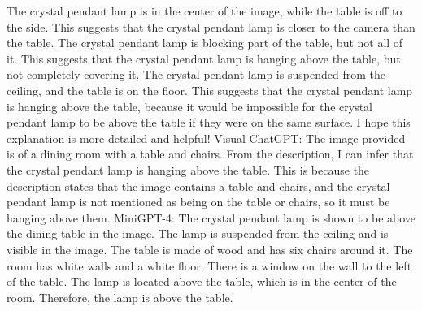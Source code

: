 \begin{enumerate}
    The crystal pendant lamp is in the center of the image, while the table is off to the side. This suggests that the crystal pendant lamp is closer to the camera than the table.
    The crystal pendant lamp is blocking part of the table, but not all of it. This suggests that the crystal pendant lamp is hanging above the table, but not completely covering it.
    The crystal pendant lamp is suspended from the ceiling, and the table is on the floor. This suggests that the crystal pendant lamp is hanging above the table, because it would be impossible for the crystal pendant lamp to be above the table if they were on the same surface.
    I hope this explanation is more detailed and helpful!
    \subitem Visual ChatGPT: The image provided is of a dining room with a table and chairs. From the description, I can infer that the crystal pendant lamp is hanging above the table. This is because the description states that the image contains a table and chairs, and the crystal pendant lamp is not mentioned as being on the table or chairs, so it must be hanging above them.
    \subitem MiniGPT-4: The crystal pendant lamp is shown to be above the dining table in the image. The lamp is suspended from the ceiling and is visible in the image. The table is made of wood and has six chairs around it. The room has white walls and a white floor. There is a window on the wall to the left of the table. The lamp is located above the table, which is in the center of the room. Therefore, the lamp is above the table.
\end{enumerate}
